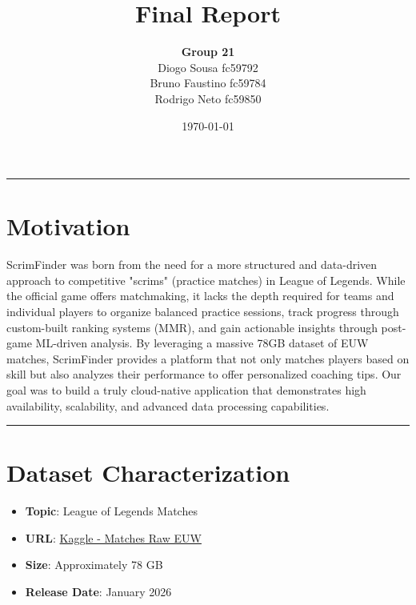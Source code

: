 \documentclass[11pt,a4paper]{article}
\title{\vspace{-2cm}\textbf{\Huge Final Report}\vspace{0.5cm}}
\author{
 \textbf{Group 21} \\
 Diogo Sousa fc59792 \\
 Bruno Faustino fc59784 \\
 Rodrigo Neto fc59850
}
\date{\today}
\newcommand{\bff}[1]{\textbf{#1}}
\begin{document}
 \maketitle
 \thispagestyle{empty}
 \tableofcontents
 \listoffigures
 \listoftables

 \vspace{1cm}
 \hrule
 \vspace{1cm}

 \section{Motivation}

 ScrimFinder was born from the need for a more structured and data-driven approach to competitive "scrims" (practice matches) in League of Legends. While the official game offers matchmaking, it lacks the depth required for teams and individual players to organize balanced practice sessions, track progress through custom-built ranking systems (MMR), and gain actionable insights through post-game ML-driven analysis. By leveraging a massive 78GB dataset of EUW matches, ScrimFinder provides a platform that not only matches players based on skill but also analyzes their performance to offer personalized coaching tips. Our goal was to build a truly cloud-native application that demonstrates high availability, scalability, and advanced data processing capabilities.

 \vspace{1cm}
 \hrule
 \vspace{1cm}

 \section{Dataset Characterization}

 \begin{itemize}
  \item \bff{Topic}: League of Legends Matches
  \item \bff{URL}: \href{https://www.kaggle.com/datasets/omaracornejo/matches-raw-euw?select=opgg_table_scraper.py}{Kaggle - Matches Raw EUW}
  \item \bff{Size}: Approximately 78 GB
  \item \bff{Release Date}: January 2026
 \end{itemize}
\end{document}

